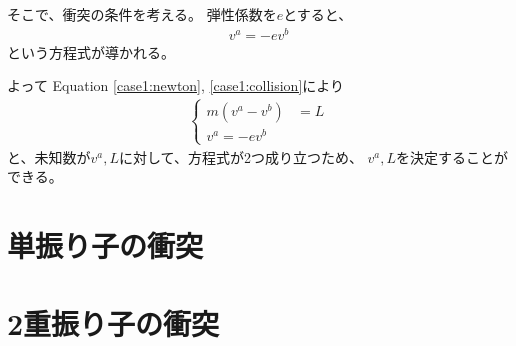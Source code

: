 \documentclass[a4paper,11pt]{jsarticle}
\begin{document}
そこで、衝突の条件を考える。
弾性係数を$e$とすると、
\begin{gather}
  v^a = -e v^b
  \label{case1:collision}
\end{gather}
という方程式が導かれる。

よって Equation \ref{case1:newton}, \ref{case1:collision}により
\begin{align*}
  \begin{cases}
    m(v^a - v^b) &= L
    \\
    v^a = -e v^b
  \end{cases}
\end{align*}
と、未知数が$v^a, L$に対して、方程式が2つ成り立つため、
$v^a, L$を決定することができる。

\section{単振り子の衝突}

\section{2重振り子の衝突}
\end{document}

